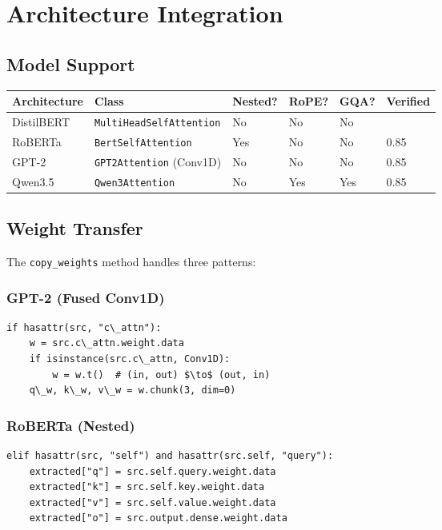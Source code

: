 
\section{Architecture Integration}

\subsection{Model Support}

\begin{table}[H]
\centering
\small
\begin{tabular}{llllll}
\toprule
\textbf{Architecture} & \textbf{Class} & \textbf{Nested?} & \textbf{RoPE?} & \textbf{GQA?} & \textbf{Verified} \\
\midrule
DistilBERT & \texttt{MultiHeadSelfAttention} & No & No & No &  \\
RoBERTa & \texttt{BertSelfAttention} & Yes & No & No & 0.85 \\
GPT-2 & \texttt{GPT2Attention} (Conv1D) & No & No & No & 0.85 \\
Qwen3.5 & \texttt{Qwen3Attention} & No & Yes & Yes & 0.85 \\
\bottomrule
\end{tabular}
\end{table}

\subsection{Weight Transfer}

The \texttt{copy\_weights} method handles three patterns:

\subsubsection{GPT-2 (Fused Conv1D)}

\begin{lstlisting}
if hasattr(src, "c\_attn"):
    w = src.c\_attn.weight.data
    if isinstance(src.c\_attn, Conv1D):
        w = w.t()  # (in, out) $\to$ (out, in)
    q\_w, k\_w, v\_w = w.chunk(3, dim=0)
\end{lstlisting}

\subsubsection{RoBERTa (Nested)}

\begin{lstlisting}
elif hasattr(src, "self") and hasattr(src.self, "query"):
    extracted["q"] = src.self.query.weight.data
    extracted["k"] = src.self.key.weight.data
    extracted["v"] = src.self.value.weight.data
    extracted["o"] = src.output.dense.weight.data
\end{lstlisting}

